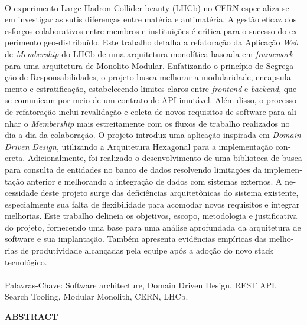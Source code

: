\begin{otherlanguage}{portuguese}
\paragraph{}O experimento Large Hadron Collider beauty (LHCb) no CERN especializa-se em investigar as sutis diferenças entre matéria e antimatéria. A gestão eficaz dos esforços colaborativos entre membros e instituições é crítica para o sucesso do experimento geo-distribuído. Este trabalho detalha a refatoração da Aplicação \textit{Web} de \textit{Membership} do LHCb de uma arquitetura monolítica baseada em \textit{framework} para uma arquitetura de Monolito Modular. Enfatizando o princípio de Segregação de Responsabilidades, o projeto busca melhorar a modularidade, encapsulamento e estratificação, estabelecendo limites claros entre \textit{frontend} e \textit{backend}, que se comunicam por meio de um contrato de API imutável. Além disso, o processo de refatoração inclui revalidação e coleta de novos requisitos de software para alinhar o \textit{Membership} mais estreitamente com os fluxos de trabalho realizados no dia-a-dia da colaboração. O projeto introduz uma aplicação inspirada em \textit{Domain Driven Design}, utilizando a Arquitetura Hexagonal para a implementação concreta. Adicionalmente, foi realizado o desenvolvimento de uma biblioteca de busca para consulta de entidades no banco de dados resolvendo limitações da implementação anterior e melhorando a integração de dados com sistemas externos. A necessidade deste projeto surge das deficiências arquitetônicas do sistema existente, especialmente sua falta de flexibilidade para acomodar novos requisitos e integrar melhorias. Este trabalho delineia os objetivos, escopo, metodologia e justificativa do projeto, fornecendo uma base para uma análise aprofundada da arquitetura de software e sua implantação. Também apresenta evidências empíricas das melhorias de produtividade alcançadas pela equipe após a adoção do novo stack tecnológico.\end{otherlanguage}
\paragraph{}
\noindent Palavras-Chave: Software architecture, Domain Driven Design, REST API, Search Tooling, Modular Monolith, CERN, LHCb.

\pagebreak


\begin{center}
\textbf{ABSTRACT}
\end{center}
      \vspace{0.5cm}

